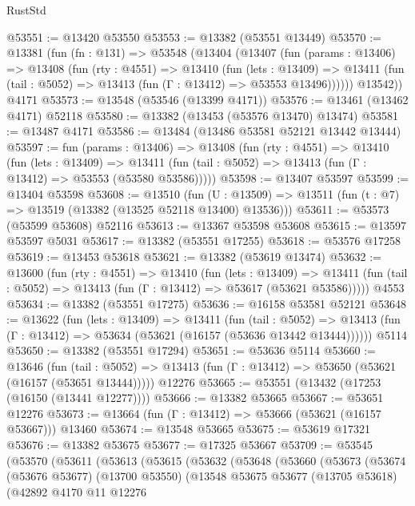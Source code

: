 \begin{lexlean}{RustStd}
\begin{coremodule}
@53551 := @13420 @53550
@53553 := @13382 (@53551 @13449)
@53570 := @13381
    (fun (fn : @131) =>
    @53548
      (@13404
        (@13407
          (fun (params : @13406) =>
          @13408
            (fun (rty : @4551) =>
            @13410
              (fun (lets : @13409) =>
              @13411 (fun (tail : @5052) => @13413 (fun (Γ : @13412) => @53553 @13496))))))
        @13542))
    @4171
@53573 := @13548 (@53546 (@13399 @4171))
@53576 := @13461 (@13462 @4171) @52118
@53580 := @13382 (@13453 (@53576 @13470) @13474)
@53581 := @13487 @4171
@53586 := @13484 (@13486 @53581 @52121 @13442 @13444)
@53597 := fun (params : @13406) =>
  @13408
    (fun (rty : @4551) =>
    @13410
      (fun (lets : @13409) =>
      @13411 (fun (tail : @5052) => @13413 (fun (Γ : @13412) => @53553 (@53580 @53586)))))
@53598 := @13407 @53597
@53599 := @13404 @53598
@53608 := @13510
    (fun (U : @13509) => @13511 (fun (t : @7) => @13519 (@13382 (@13525 @52118 @13400) @13536)))
@53611 := @53573 (@53599 @53608) @52116
@53613 := @13367 @53598 @53608
@53615 := @13597 @53597 @5031
@53617 := @13382 (@53551 @17255)
@53618 := @53576 @17258
@53619 := @13453 @53618
@53621 := @13382 (@53619 @13474)
@53632 := @13600
    (fun (rty : @4551) =>
    @13410
      (fun (lets : @13409) =>
      @13411 (fun (tail : @5052) => @13413 (fun (Γ : @13412) => @53617 (@53621 @53586)))))
    @4553
@53634 := @13382 (@53551 @17275)
@53636 := @16158 @53581 @52121
@53648 := @13622
    (fun (lets : @13409) =>
    @13411
      (fun (tail : @5052) =>
      @13413 (fun (Γ : @13412) => @53634 (@53621 (@16157 (@53636 @13442 @13444))))))
    @5114
@53650 := @13382 (@53551 @17294)
@53651 := @53636 @5114
@53660 := @13646
    (fun (tail : @5052) => @13413 (fun (Γ : @13412) => @53650 (@53621 (@16157 (@53651 @13444)))))
    @12276
@53665 := @53551 (@13432 (@17253 (@16150 (@13441 @12277))))
@53666 := @13382 @53665
@53667 := @53651 @12276
@53673 := @13664 (fun (Γ : @13412) => @53666 (@53621 (@16157 @53667))) @13460
@53674 := @13548 @53665
@53675 := @53619 @17321
@53676 := @13382 @53675
@53677 := @17325 @53667
@53709 := @53545
    (@53570
      (@53611
        (@53613
          (@53615
            (@53632
              (@53648
                (@53660
                  (@53673
                    (@53674
                      (@53676 @53677)
                      (@13700 @53550)
                      (@13548
                        @53675
                        @53677
                        (@13705 @53618)
                        (@42892
                          @4170
                          @11
                          @12276

\end{coremodule}
\end{lexlean}
